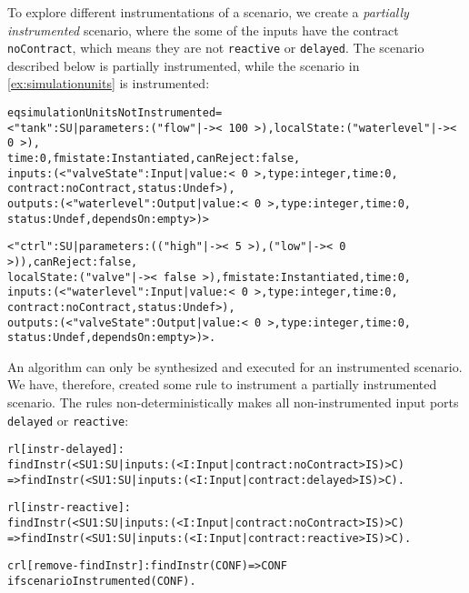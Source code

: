 To explore different instrumentations of a scenario, we create a \emph{partially instrumented} scenario, where the some of the inputs have the contract \texttt{noContract}, which means they are not \texttt{reactive} or \texttt{delayed}.
The scenario described below is partially instrumented, while the scenario in \cref{ex:simulationunits} is instrumented:
\scriptsize
\begin{alltt}
eq simulationUnitsNotInstrumented = 
< "tank" : SU | parameters : ("flow" |-> <\,100\,>),  localState : ("waterlevel" |-> <\,0\,>),
                time : 0,  fmistate : Instantiated, canReject : false, 
                inputs : (< "valveState" : Input | value : <\,0\,>, type : integer, time : 0,
                                                   contract : noContract, status : Undef >), 
                outputs : (< "waterlevel" : Output | value : <\,0\,>, type : integer, time : 0,
                                                     status : Undef, dependsOn : empty >) >

< "ctrl" : SU | parameters : (("high" |-> <\,5\,>) , ("low" |-> <\,0\,>)), canReject : false, 
                localState : ("valve" |-> <\,false\,>), fmistate : Instantiated, time : 0, 
                inputs : (< "waterlevel" : Input | value : <\,0\,>, type : integer, time : 0,
                                                   contract : noContract, status : Undef >), 
                outputs : (< "valveState" : Output | value : <\,0\,>, type : integer, time : 0,
                                                     status : Undef, dependsOn : empty >) > . 

\end{alltt}
\normalsize

An algorithm can only be synthesized and executed for an instrumented scenario. 
We have, therefore, created some rule to instrument a partially instrumented scenario.
The rules non-deterministically makes all non-instrumented input ports \texttt{delayed} or \texttt{reactive}:

\scriptsize
\begin{alltt}
rl [instr-delayed]: 
  findInstr(< SU1 : SU | inputs : (< I : Input | contract : noContract > IS) > C)
  => findInstr(< SU1 : SU | inputs : (< I : Input | contract : delayed > IS) > C) .

rl [instr-reactive]: 
  findInstr(< SU1 : SU | inputs : (< I : Input | contract :   noContract > IS) > C)
  => findInstr(< SU1 : SU | inputs : (< I : Input | contract : reactive > IS) > C) .

crl [remove-findInstr]: findInstr(CONF) => CONF 
  if scenarioInstrumented(CONF) .
\end{alltt}
\normalsize

